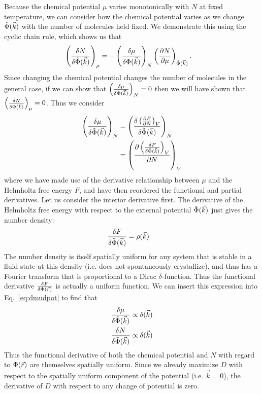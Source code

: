 Because the chemical potential $\mu$ varies monotonically with $N$ at fixed temperature, we can consider how the chemical potential varies as we change $\tilde\Phi(\vec k)$ with the number of molecules held fixed.  We demonstrate this using the cyclic chain rule, which shows us that
\begin{align}
    \left(\frac{\delta N}{\delta \tilde\Phi(\vec k)}\right)_{\mu} &=
    -\left(\frac{\delta \mu}{\delta \Phi(\vec k)}\right)_{N}
    \left(\frac{\partial N}{\partial \mu}\right)_{\tilde\Phi(\vec k)}.
\end{align}
Since changing the chemical potential changes the number of molecules in the general case, if we can show that $\left(\frac{\delta \mu}{\delta \Phi(\vec k)}\right)_{N}=0$ then we will have shown that $\left(\frac{\delta N}{\delta \Phi(\vec k)}\right)_{\mu}=0$.  Thus we consider
\begin{align}
    \left(\frac{\delta \mu}{\delta \tilde{\Phi}(\vec k)}\right)_N
    &= \left(\frac{\delta \left(\frac{\partial F}{\partial N}\right)_{V}}{\delta \tilde\Phi(\vec k)}\right)_N
    \\
    &= \left(\frac{\partial \left(\frac{\delta F}{\delta \tilde\Phi(\vec k)}\right)_{V}}{\partial N}\right)_{V}
    \label{eq:dmudpot}
\end{align}
where we have made use of the derivative relationship between $\mu$ and the Helmholtz free energy $F$, and have then reordered the functional and partial derivatives.
Let us consider the interior derivative first.  The derivative of the Helmholtz free energy with respect to the external potential $\tilde\Phi(\vec k)$ just gives the number density:
\begin{align}
    \frac{\delta F}{\delta \tilde\Phi(\vec k)} &= \rho(\vec k)
\end{align}
The number density is itself spatially uniform for any system that is stable in a fluid state at this density (i.e. does not spontaneously crystallize), and thus has a Fourier transform that is proportional to a Dirac $\delta$-function.  Thus the functional derivative $\frac{\delta F}{\delta \Phi(\vec r)}$ is actually a uniform function.
We can insert this expression into Eq.~\ref{eq:dmudpot} to find that
\begin{align}
    \frac{\delta \mu}{\delta \tilde\Phi(\vec k)} &\propto \delta(\vec k) \\
    \frac{\delta N}{\delta \tilde\Phi(\vec k)} &\propto \delta(\vec k)
\end{align}
Thus the functional derivative of both the chemical potential and $N$ with regard to $\Phi(\vec r)$ are themselves spatially uniform.  Since we already maximize $D$ with respect to the spatially uniform component of the potential (i.e. $\vec k=0$), the derivative of $D$ with respect to any change of potential is zero.

